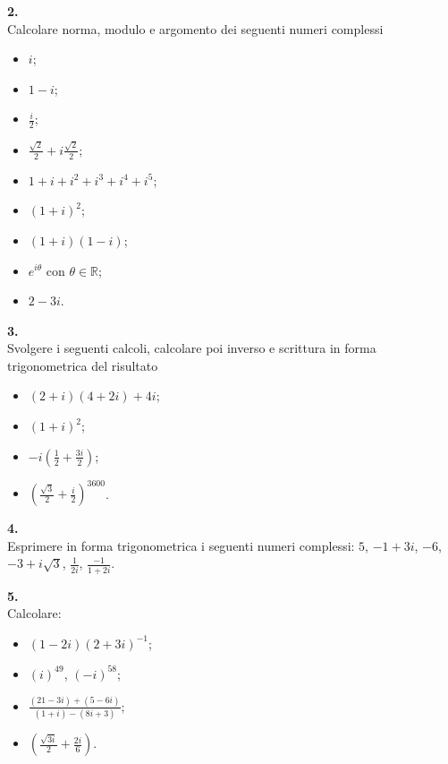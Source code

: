 \documentclass[italian,a4paper,11pt]
{article}
\newcommand{\R}{\mathbb{R}}
\begin{document}
\vspace{0.4cm}
\noindent
\begin{Ex}\textbf{ 2.}\\
Calcolare norma, modulo e argomento dei seguenti numeri complessi
\begin{itemize}
	\item $i$;
	\item $1-i$;
	\item $\frac{i}{2}$;
	\item $\frac{\sqrt{2}}{2}+i\frac{\sqrt{2}}{2}$;
	\item $1+i+i^2+i^3+i^4+i^5$;
	\item $(1+i)^2$;
	\item $(1+i)(1-i)$;
	\item $e^{i\theta}$ con $\theta \in \R$;
	\item $2-3i$.
\end{itemize}
\end{Ex}

\vspace{0.4cm}
\noindent
\begin{Ex}\textbf{ 3.}\\
Svolgere i seguenti calcoli, calcolare poi inverso e scrittura in forma trigonometrica del risultato
\begin{itemize}
	\item $(2+i)(4+2i)+4i$;
	\item $(1+i)^2$;
	\item $-i(\frac{1}{2} + \frac{3i}{2})$;
	\item $(\frac{\sqrt{3}}{2}+\frac{i}{2})^{3600}$.
\end{itemize}
\end{Ex}


\vspace{0.4cm}
\noindent
\begin{Ex}\textbf{ 4.}\\
Esprimere in forma trigonometrica i seguenti numeri complessi:
$5$, $-1+3i$, $-6$, $-3+i\sqrt{3}$, $\frac{1}{2i}$, $\frac{-1}{1+2i}$.
\end{Ex}

\vspace{0.4cm}
\noindent
\begin{Ex}\textbf{ 5.}\\
Calcolare:
\begin{itemize}
	\item $(1-2i)(2+3i)^{-1}$;
	\item $(i)^{49}$, $(-i)^{58}$;
	\item $\frac{(21-3i)+(5-6i)}{(1+i)-(8i+3)}$;
	\item $(\frac{\sqrt{3i}}{2}+\frac{2i}{6})$.
\end{itemize}
\end{Ex}
\end{document}
